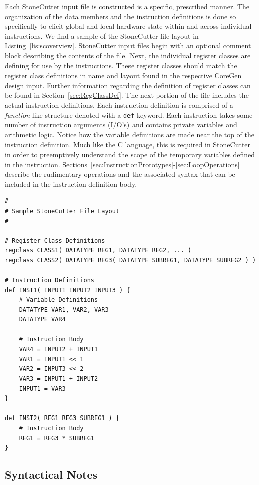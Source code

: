 \documentclass{article}
\begin{document}
Each StoneCutter input file is constructed is a specific, prescribed manner.  The organization of the data members and 
the instruction definitions is done so specifically to elicit global and local hardware state within and across individual instructions.  
We find a sample of the StoneCutter file layout in Listing~\ref{lis:scoverview}.  
StoneCutter input files begin with an optional comment block describing the contents of the file.  Next, the individual register 
classes are defining for use by the instructions.  These register classes should match the register class definitions in name and 
layout found in the respective CoreGen design input.  Further information regarding the definition of register classes can 
be found in Section~\ref{sec:RegClassDef}.  The next portion of the file includes the actual instruction definitions.  Each 
instruction definition is comprised of a \textit{function}-like structure denoted with a \texttt{def} keyword.  Each instruction 
takes some number of instruction arguments (I/O's) and contains private variables and arithmetic logic.  Notice how 
the variable definitions are made near the top of the instruction definition.  Much like the C language, this is required 
in StoneCutter in order to preemptively understand the scope of the temporary variables defined in the instruction.  
Sections~\ref{sec:InstructionPrototypes}-\ref{sec:LoopOperations} 
describe the rudimentary operations and the associated syntax that can be included in the instruction 
definition body.  

\clearpage
\vspace{0.125in}
\begin{lstlisting}[frame=single,style=base,caption={StoneCutter File Structure},captionpos=b,label={lis:scoverview}]
#
# Sample StoneCutter File Layout
#

# Register Class Definitions
regclass CLASS1( DATATYPE REG1, DATATYPE REG2, ... )
regclass CLASS2( DATATYPE REG3( DATATYPE SUBREG1, DATATYPE SUBREG2 ) )

# Instruction Definitions
def INST1( INPUT1 INPUT2 INPUT3 ) {
	# Variable Definitions
	DATATYPE VAR1, VAR2, VAR3
	DATATYPE VAR4
	
	# Instruction Body
	VAR4 = INPUT2 + INPUT1
	VAR1 = INPUT1 << 1
	VAR2 = INPUT3 << 2
	VAR3 = INPUT1 + INPUT2
	INPUT1 = VAR3
}

def INST2( REG1 REG3 SUBREG1 ) {
	# Instruction Body
	REG1 = REG3 * SUBREG1
}
\end{lstlisting}

\subsection{Syntactical Notes}
\label{sec:SyntacticalNotes}
\end{document}
